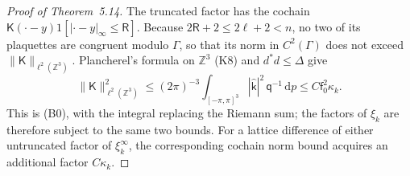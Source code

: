 \documentclass[11pt,letterpaper,reqno]{amsart}
\theoremstyle{definition}
\begin{document}
\begin{proof}[Proof of Theorem~5.14]
The truncated factor has the cochain $\mathsf K(\cdot-y)1[|\cdot-y|_\infty\le\mathsf R]$.
Because $2\mathsf R+2\le2\ell+2<n$, no two of its plaquettes are congruent modulo $\Gamma$, so that its norm in $C^2(\Gamma)$ does not exceed $\|\mathsf K\|_{\ell^2(\mathbb Z^3)}$.
Plancherel's formula on $\mathbb Z^3$ (K8) and $d^*d\le\Delta$ give
\begin{equation*}
\|\mathsf K\|^2_{\ell^2(\mathbb Z^3)}\le(2\pi)^{-3}\int_{[-\pi,\pi]^3}|\hat{\mathsf k}|^2\,\mathsf q^{-1}\,\mathrm dp\le C\mathsf f_0^2\kappa_k.
\end{equation*}
This is (B0), with the integral replacing the Riemann sum; the factors of $\xi_k$ are therefore subject to the same two bounds.
For a lattice difference of either untruncated factor of $\xi_k^\infty$, the corresponding cochain norm bound acquires an additional factor $C\kappa_k$.


\end{proof}
\end{document}
